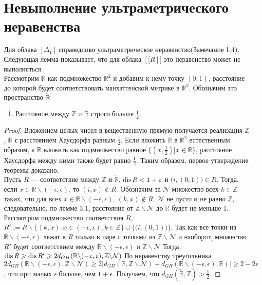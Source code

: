 
\section{Невыполнение ультраметрического неравенства}
Для облака $[\Delta_{1}]$ справедливо ультраметрическое неравенство(Замечание
1.4). Следующая лемма показывает, что для облака $[\mathbb[R]]$
это неравенство может не выполняться. \\
Рассмотрим $\mathbb{R}$ как подмножество
$\mathbb{R}^2$ и добавим к нему точку $(0,1)$, расстояние до которой будет
соответствовать манхэттенской метрике в $\mathbb{R}^2$. Обозначим это
пространство $\widetilde{\mathbb{R}}$.
\begin{theorem}
\begin{enumerate}
 $\mathbb{Z}$ и $\widetilde{\mathbb{R}}$ находятся от $\mathbb{R}$
на расстоянии\\ не большем $\frac 1 2$.
\item Расстояние между $\mathbb{Z}$ и $\widetilde{\mathbb{R}}$ строго
больше $\frac 1 2$.
\end{enumerate}
\end{theorem}
\begin{proof}
Вложением целых чисел в вещественную прямую получается реализация $\mathbb{Z}$, $\mathbb{R}$ с расстоянием Хаусдорфа равным $\frac 1 2$.
Если вложить $\widetilde{\mathbb{R}}$ в $\mathbb{R}^{2}$ естественным образом, а $\mathbb{R}$ вложить как подмножество равное $\{(x, \frac1 2 )|x\in \mathbb{R}\}$,
расстояние Хаусдорфа между ними также будет равно $\frac 1 2$. Таким образом, первое утверждение теоремы доказано. \\
Пусть $R$ --- соответствие
между $\mathbb{Z}$ и $\widetilde{\mathbb{R}}$, $\operatorname{dis} R < 1 + \upvarepsilon$ и
$\big(i, (0,1)\big) \in R$. Тогда, если
$x \in \mathbb{R}\backslash(-\epsilon, \epsilon)$, то $(i, x) \notin R$.
Обозначим за $\mathcal{N}$ множество всех $k \in \mathbb{Z}$ таких, что для всех
$x \in \mathbb{R}\backslash(-\epsilon, \epsilon)$, $(k,x) \notin R$.
$\mathcal{N}$ не пусто и не равно $\mathbb{Z}$, следовательно, по лемме 3.1,
расстояние от $\mathbb{Z} \backslash \mathcal{N}$ до $\mathbb{R}$ будет не
меньше 1. Рассмотрим подмножество соответствия $R$,
$R' := R \backslash \{(k,x): x\in (-\epsilon, \epsilon), k \in \mathbb{Z}\} \cup \{\big(i, (0,1)\big)\}$.
Так как все точки из $\mathbb{R}\backslash(-\epsilon, \epsilon)$ лежат в $R$
только в паре с точками из $ \mathbb{Z} \backslash \mathcal{N}$ и наоборот,
множество $R'$ будет соответствием между
$\mathbb{R}\backslash(-\epsilon, \epsilon)$ и
$ \mathbb{Z} \backslash \mathcal{N}$  Тогда,
$\operatorname{dis} R \geqslant \operatorname{dis} R' \geqslant 2d_{GH}(\mathbb{R}\backslash(-\upvarepsilon, \upvarepsilon), \mathbb{Z} \backslash \mathcal{N})$
По неравенству треугольника
$2d_{GH}(\mathbb{R}\backslash(-\epsilon, \epsilon), \mathbb{Z} \backslash \mathcal{N}) \ge 2|d_{GH}(\mathbb{R}, \mathbb{Z} \backslash \mathcal{N}) - d_{GH}(\mathbb{R}\backslash(-\epsilon, \epsilon), \mathbb{R})| \ge 2 - 2\epsilon$,
что при малых $\epsilon$ больше, чем $1 + \epsilon$. Получаем, что
$d_{GH}(\widetilde{\mathbb{R}}, \mathbb{Z}) > \frac{1}{2}$.
\end{proof}
